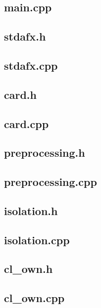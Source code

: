 \documentclass[a4paper,12pt,notitlepage]{article}
\begin{document}
\begin{appendices}
		\subsection{main.cpp}
		\label{app:maincpp}
		
		\subsection{stdafx.h}
		
		\subsection{stdafx.cpp}
		
		\subsection{card.h}
		
		\subsection{card.cpp}
		
		\subsection{preprocessing.h}
		
		\subsection{preprocessing.cpp}
		
		\subsection{isolation.h}
		
		\subsection{isolation.cpp}
		\label{app:isolationcpp}
		
		\subsection{cl\_own.h}
		
		\subsection{cl\_own.cpp}
		\label{app:clowncpp}
		

\end{appendices}
\end{document}
